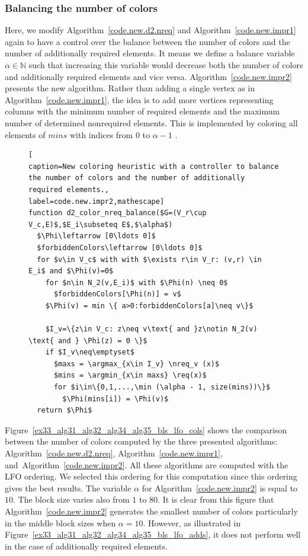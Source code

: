 \documentclass[12pt, twoside,a4paper,toc=bibliography]{scrbook}
\DeclareMathOperator*{\argmin}{arg\,min}
\DeclareMathOperator*{\argmax}{arg\,max}
\newcommand{\figref}[1]{Figure~\protect\ref{#1}}
\newcommand{\coderef}[1]{Algorithm~\protect\ref{#1}}
\newcommand{\nreq}{L}
\newcommand{\req}{M}
\begin{document}
\subsubsection{Balancing the number of colors}
Here, we modify \coderef{code.new.d2.nreq} and \coderef{code.new.impr1} again
to have a control over the balance between the number of
colors and the number of additionally required elements.
It means we define a balance variable $\alpha \in \mathbb{N}$ such that increasing this variable
would decrease both the number of colors and additionally required elements and vice versa.
\coderef{code.new.impr2} presents the new algorithm.
Rather than adding a single vertex as in \coderef{code.new.impr1},
the idea is to add more vertices representing columns
with the minimum number of required elements
and the maximum number of determined nonrequired elements.
This is implemented by coloring all elements of $mins$ with indices from $0$ to $\alpha-1$ .
\begin{figure}
\begin{lstlisting}[
caption=New coloring heuristic with a controller to balance
the number of colors and the number of additionally required elements.,
label=code.new.impr2,mathescape]
function d2_color_nreq_balance($G=(V_r\cup V_c,E)$,$E_i\subseteq E$,$\alpha$)
  $\Phi\leftarrow [0\ldots 0]$
  $forbiddenColors\leftarrow [0\ldots 0]$
  for $v\in V_c$ with with $\exists r\in V_r: (v,r) \in E_i$ and $\Phi(v)=0$
    for $n\in N_2(v,E_i)$ with $\Phi(n) \neq 0$
      $forbiddenColors[\Phi(n)] = v$
    $\Phi(v) = min \{ a>0:forbiddenColors[a]\neq v\}$

    $I_v=\{z\in V_c: z\neq v\text{ and }z\notin N_2(v) \text{ and } \Phi(z) = 0 \}$
    if $I_v\neq\emptyset$
      $maxs = \argmax_{x\in I_v} \nreq_v (x)$
      $mins = \argmin_{x\in maxs} \req(x)$
      for $i\in\{0,1,...,\min (\alpha - 1, size(mins))\}$
        $\Phi(mins[i]) = \Phi(v)$
  return $\Phi$
\end{lstlisting}
\end{figure}

\figref{ex33_alg31_alg32_alg34_alg35_bls_lfo_cols}
shows the comparison between the number of colors computed by
the three presented algorithms: \coderef{code.new.d2.nreq},
\coderef{code.new.impr1}, and~\coderef{code.new.impr2}.
All these algorithms are computed with the LFO ordering.
We selected this ordering for this computation
since this ordering gives the best results.
The variable $\alpha$ for \coderef{code.new.impr2} is equal to $10$.
The block size varies also from $1$ to $80$.
It is clear from this figure that \coderef{code.new.impr2} generates the
smallest number of colors particularly in the middle block sizes when $\alpha=10$.
However, as illustrated in \figref{ex33_alg31_alg32_alg34_alg35_bls_lfo_adds},
it does not perform well in the case of additionally required elements.
\end{document}
